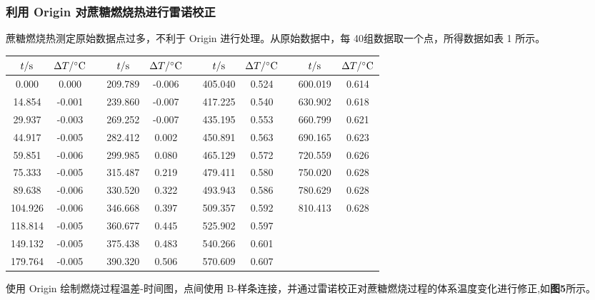 \documentclass[12pt]{article}
\begin{document}
		\subsubsection{利用 Origin 对蔗糖燃烧热进行雷诺校正}
		蔗糖燃烧热测定原始数据点过多，不利于 Origin 进行处理。从原始数据中，每 40组数据取一个点，所得数据如表 1 所示。\par
		\begin{table}[h]
			\centering
			\begin{tabular}{ccccccccccc}
				\arrayrulecolor{Maroon}
				\toprule
				$t/{\rm s}$ & $\Delta T/{\rm ^{\circ}C}$ & & $t/{\rm s}$ & $\Delta T/{\rm ^{\circ}C}$& & 	$t/{\rm s}$ & $\Delta T/{\rm ^{\circ}C}$ & & $t/{\rm s}$ & $\Delta T/{\rm ^{\circ}C}$ \\
				\midrule
				0.000   & 0.000  &  & 209.789 & -0.006 &  & 405.040 & 0.524 &  & 600.019 & 0.614 \\
				14.854  & -0.001 &  & 239.860 & -0.007&  & 417.225 & 0.540 &  & 630.902 & 0.618 \\
				29.937  & -0.003 &  & 269.252 & -0.007 &  & 435.195 & 0.553 &  & 660.799 & 0.621 \\
				44.917  & -0.005 &  & 282.412 & 0.002  &  & 450.891 & 0.563 &  & 690.165 & 0.623 \\
				59.851  & -0.006 &  & 299.985 & 0.080  &  & 465.129 & 0.572 &  & 720.559 & 0.626 \\
				75.333  & -0.005 &  & 315.487 & 0.219  &  & 479.411 & 0.580 &  & 750.020 & 0.628 \\
				89.638  & -0.006 &  & 330.520 & 0.322  &  & 493.943 & 0.586 &  & 780.629 & 0.628 \\
				104.926 & -0.006 &  & 346.668 & 0.397  &  & 509.357 & 0.592 &  & 810.413 & 0.628 \\
				118.814 & -0.005 &  & 360.677 & 0.445  &  & 525.902 & 0.597 &  &     &       \\
				149.132 & -0.005 &  & 375.438 & 0.483  &  & 540.266 & 0.601 &  &     &       \\
				179.764 & -0.005 &  & 390.320 & 0.506  &  & 570.609 & 0.607 &  &     &        \\
				\bottomrule
			\end{tabular}
		\end{table}
		\par
		使用 Origin 绘制燃烧过程温差-时间图，点间使用 B-样条连接，并通过雷诺校正对蔗糖燃烧过程的体系温度变化进行修正,如\textbf{图5}所示。
\end{document}
